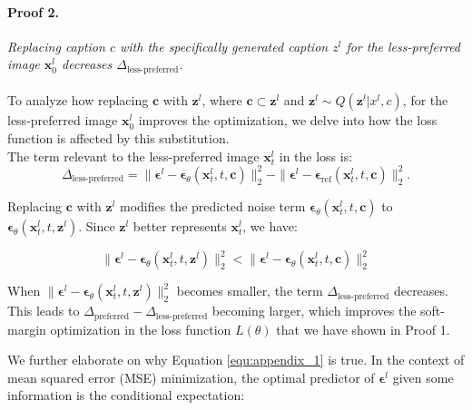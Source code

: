 \paragraph{Proof 2.} \textit{Replacing caption $ c $ with the specifically generated caption $ z^l $ for the less-preferred image $ \mathbf{x}_0^l $ decreases $\Delta_{\text{less-preferred}}$.}
\\
\\
To analyze how replacing $ \mathbf{c} $ with $ \mathbf{z}^l $, where $ \mathbf{c} \subset \mathbf{z}^l $ and  $\mathbf{z}^l \sim Q(\mathbf{z}^l | x^l, c)$, for the less-preferred image $ \mathbf{x}_0^l $ improves the optimization, we delve into how the loss function is affected by this substitution.
\\
The term relevant to the less-preferred image $ \mathbf{x}_t^l $ in the loss is:
$$
\Delta_{\text{less-preferred}} = \| \boldsymbol{\epsilon}^l - \boldsymbol{\epsilon}_\theta(\mathbf{x}_t^l, t, \mathbf{c}) \|_2^2 - \| \boldsymbol{\epsilon}^l - \boldsymbol{\epsilon}_{\text{ref}}(\mathbf{x}_t^l, t, \mathbf{c}) \|_2^2.
$$

Replacing $ \mathbf{c} $ with $ \mathbf{z}^l $ modifies the predicted noise term $ \boldsymbol{\epsilon}_\theta(\mathbf{x}_t^l, t, \mathbf{c}) $ to $ \boldsymbol{\epsilon}_\theta(\mathbf{x}_t^l, t, \mathbf{z}^l) $. Since $ \mathbf{z}^l $ better represents $ \mathbf{x}_t^l $, we have:

\begin{equation}
\label{equ:appendix_1}
\| \boldsymbol{\epsilon}^l - \boldsymbol{\epsilon}_\theta(\mathbf{x}_t^l, t, \mathbf{z}^l) \|_2^2 < \| \boldsymbol{\epsilon}^l - \boldsymbol{\epsilon}_\theta(\mathbf{x}_t^l, t, \mathbf{c}) \|_2^2 
\end{equation}

When $ \| \boldsymbol{\epsilon}^l - \boldsymbol{\epsilon}_\theta(\mathbf{x}_t^l, t, \mathbf{z}^l) \|_2^2 $ becomes smaller, the term $ \Delta_{\text{less-preferred}} $ decreases. This leads to $\Delta_{\text{preferred}} - \Delta_{\text{less-preferred}}$ becoming larger, which improves the soft-margin optimization in the loss function $ L(\theta) $ that we have shown in Proof 1.




We further elaborate on why Equation \ref{equ:appendix_1} is true. In the context of mean squared error (MSE) minimization, the optimal predictor of $ \boldsymbol{\epsilon}^l $ given some information is the conditional expectation:


